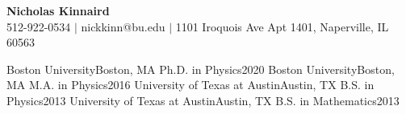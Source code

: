 

\begin{center}
  \textbf{{\Large Nicholas Kinnaird}} \\
  \small 512-922-0534 $\vert$ nickkinn@bu.edu $\vert$ 1101 Iroquois Ave Apt 1401, Naperville, IL 60563
\end{center}

  \resumeSubHeadingListStart
    \resumeSubheading
      {Boston University}{Boston, MA}
      {Ph.D. in Physics}{2020}{
    }
    \resumeSubheading
      {Boston University}{Boston, MA}
      {M.A. in Physics}{2016}{
    }
    \resumeSubheading
      {University of Texas at Austin}{Austin, TX}
      {B.S. in Physics}{2013}
    \resumeSubheading
      {University of Texas at Austin}{Austin, TX}
      {B.S. in Mathematics}{2013}{}
  \resumeSubHeadingListEnd



